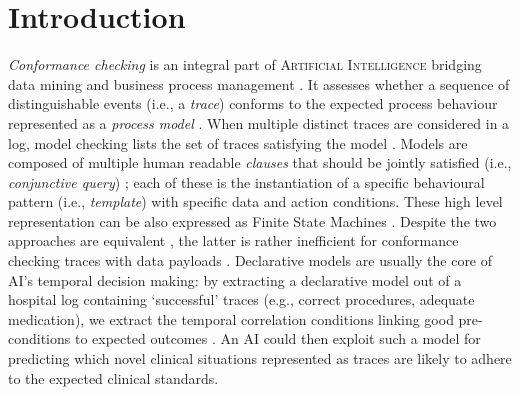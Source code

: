\section{Introduction}

\textit{Conformance checking} is an integral part of \textsc{Artificial Intelligence} {bridging} data mining and business process management \cite{bpm21}. It assesses whether a sequence of distinguishable events (i.e., a \textit{trace}) conforms to the expected process behaviour represented as a \textit{process model} \cite{RozinatA08}. When multiple distinct traces are considered in a log, model checking lists the set of traces satisfying the model \cite{BurattinMS16}. Models are composed of multiple human readable \textit{clauses} that should be  jointly satisfied (i.e., \textit{conjunctive query}) \cite{Li2020}; each of these is the instantiation of a specific behavioural pattern (i.e., \textit{template}) with specific data and action conditions. These high level representation can be also expressed as Finite State Machines \cite{MultiPerspective}. %
{Despite the two approaches are equivalent}  \cite{AgostinelliBFMM21}, {the latter is rather inefficient for conformance checking traces with data payloads} \cite{bpm21}. %
{Declarative models are usually   the core} of AI's temporal decision making: by extracting a declarative model out of a hospital log \cite{mining} containing `successful' traces (e.g., correct procedures, adequate medication), we extract the temporal correlation conditions linking good pre-conditions to expected outcomes  \cite{Amantea2020}. An AI could then exploit such a model
for predicting which novel clinical situations represented as %
traces are likely to adhere to the expected clinical standards.

